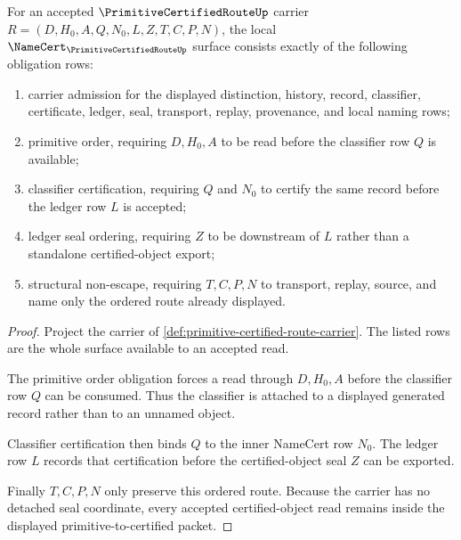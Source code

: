 \begin{theorem}
\label{thm:primitive-certified-route-namecert-obligations}
For an accepted $\PrimitiveCertifiedRouteUp$ carrier $R=(D,H_0,A,Q,N_0,L,Z,T,C,P,N)$, the local $\NameCert_{\PrimitiveCertifiedRouteUp}$ surface consists exactly of the following obligation rows:
\begin{enumerate}
\item carrier admission for the displayed distinction, history, record, classifier, certificate, ledger, seal, transport, replay, provenance, and local naming rows;
\item primitive order, requiring $D,H_0,A$ to be read before the classifier row $Q$ is available;
\item classifier certification, requiring $Q$ and $N_0$ to certify the same record before the ledger row $L$ is accepted;
\item ledger seal ordering, requiring $Z$ to be downstream of $L$ rather than a standalone certified-object export;
\item structural non-escape, requiring $T,C,P,N$ to transport, replay, source, and name only the ordered route already displayed.
\end{enumerate}
\end{theorem}
\begin{proof}
Project the carrier of \autoref{def:primitive-certified-route-carrier}. The listed rows are the whole surface available to an accepted read.

The primitive order obligation forces a read through $D,H_0,A$ before the classifier row $Q$ can be consumed. Thus the classifier is attached to a displayed generated record rather than to an unnamed object.

Classifier certification then binds $Q$ to the inner NameCert row $N_0$. The ledger row $L$ records that certification before the certified-object seal $Z$ can be exported.

Finally $T,C,P,N$ only preserve this ordered route. Because the carrier has no detached seal coordinate, every accepted certified-object read remains inside the displayed primitive-to-certified packet.
\end{proof}

